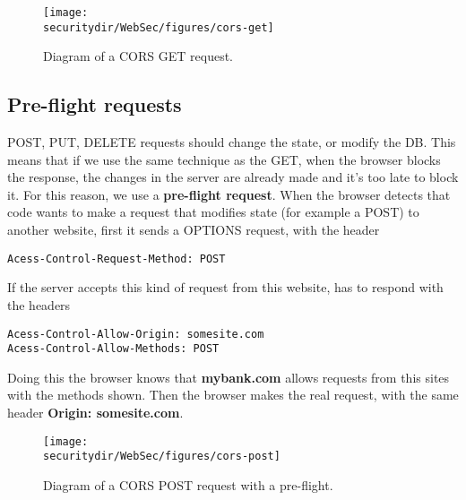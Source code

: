 \begin{figure}[htb]
	\begin{centering}
		\texttt{[image: \\securitydir/WebSec/figures/cors-get]}
		\par\end{centering}
	\caption{\label{fig:cors-get} Diagram of a CORS GET request.}
\end{figure}


\subsection{Pre-flight requests}
POST, PUT, DELETE requests should change the state, or modify the DB. This means that if we use the same technique as the GET, when the browser blocks the response, the changes in the server are already made and it's too late to block it. For this reason, we use a \textbf{pre-flight request}. When the browser detects that code wants to make a request that modifies state (for example a POST) to another website, first it sends a OPTIONS request, with the header \begin{lstlisting}[style=verbs]
Acess-Control-Request-Method: POST
\end{lstlisting}
If the server accepts this kind of request from this website, has to respond with the headers 
\begin{lstlisting}[style=verbs]
Acess-Control-Allow-Origin: somesite.com
Acess-Control-Allow-Methods: POST
\end{lstlisting}
Doing this the browser knows that \textbf{mybank.com} allows requests from this sites with the methods shown. Then the browser makes the real request, with the same header \textbf{Origin: somesite.com}. 


\begin{figure}[htb]
	\begin{centering}
		\texttt{[image: \\securitydir/WebSec/figures/cors-post]}
		\par\end{centering}
	\caption{\label{fig:cors-post} Diagram of a CORS POST request with a pre-flight.}
\end{figure}